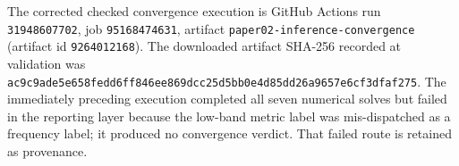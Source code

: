 \documentclass[aps,pra,onecolumn,superscriptaddress,nofootinbib]{revtex4-2}
\begin{document}
The corrected checked convergence execution is GitHub Actions run \texttt{31948607702}, job \texttt{95168474631}, artifact \texttt{paper02-inference-convergence} (artifact id \texttt{9264012168}).  The downloaded artifact SHA-256 recorded at validation was \texttt{ac9c9ade5e658fedd6ff846ee869dcc25d5bb0e4d85dd26a9657e6cf3dfaf275}.  The immediately preceding execution completed all seven numerical solves but failed in the reporting layer because the low-band metric label was mis-dispatched as a frequency label; it produced no convergence verdict.  That failed route is retained as provenance.



\end{document}
